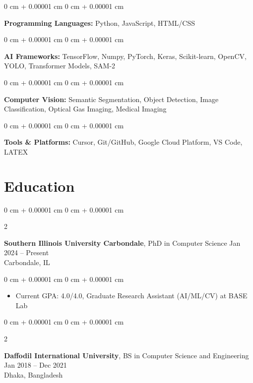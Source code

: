\documentclass[10pt, letterpaper]{article}
\newenvironment{highlights}{
    \begin{itemize}[
        topsep=0.10 cm,
        parsep=0.10 cm,
        partopsep=0pt,
        itemsep=0pt,
        leftmargin=0 cm + 10pt
    ]
}{
    \end{itemize}
} %
\newenvironment{onecolentry}{
    \begin{adjustwidth}{
        0 cm + 0.00001 cm
    }{
        0 cm + 0.00001 cm
    }
}{
    \end{adjustwidth}
} %
\newenvironment{twocolentry}[2][]{
    \onecolentry
    \def\secondColumn{#2}
    \setcolumnwidth{\fill, 4.5 cm}
    \begin{paracol}{2}
}{
    \switchcolumn \raggedleft \secondColumn
    \end{paracol}
    \endonecolentry
} %
\begin{document}
        \begin{onecolentry}
            \textbf{Programming Languages:} Python, JavaScript, HTML/CSS
        \end{onecolentry}

        \vspace{0.1 cm}

        \begin{onecolentry}
            \textbf{AI Frameworks:} TensorFlow, Numpy, PyTorch, Keras, Scikit-learn, OpenCV, YOLO, Transformer Models, SAM-2
        \end{onecolentry}

        \vspace{0.1 cm}

        \begin{onecolentry}
            \textbf{Computer Vision:} Semantic Segmentation, Object Detection, Image Classification, Optical Gas Imaging, Medical Imaging
        \end{onecolentry}

        \vspace{0.1 cm}

        \begin{onecolentry}
            \textbf{Tools \& Platforms:} Cursor, Git/GitHub, Google Cloud Platform, VS Code, LATEX
        \end{onecolentry}



   \section{Education}

        \begin{twocolentry}{
            Jan 2024 – Present
            \\Carbondale, IL
        }
            \textbf{Southern Illinois University Carbondale}, PhD in Computer Science\end{twocolentry}

        \vspace{-0.40 cm}
        \begin{onecolentry}
            \begin{highlights}
                \item Current GPA: 4.0/4.0, Graduate Research Assistant (AI/ML/CV) at BASE Lab 
            \end{highlights}
        \end{onecolentry}

        \vspace{0.25 cm}
        \begin{twocolentry}{
            Jan 2018 – Dec 2021
            \\Dhaka, Bangladesh
        }
            \textbf{Daffodil International University}, BS in Computer Science and Engineering\end{twocolentry}
\end{document}

